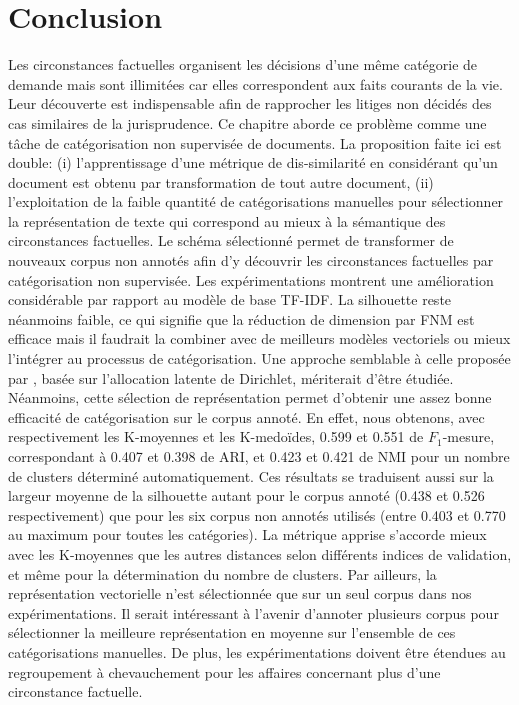 \section{Conclusion}
\label{sec:similarite:conclusion}
Les circonstances factuelles organisent les décisions d'une même catégorie de demande mais sont illimitées car elles correspondent aux faits courants de la vie. Leur découverte est indispensable afin de rapprocher les litiges non décidés des cas similaires de la jurisprudence.  Ce chapitre aborde ce problème comme une tâche de catégorisation non supervisée de documents. La proposition faite ici est double: (i) l'apprentissage d'une métrique de dis-similarité en considérant qu'un document est obtenu par transformation de tout autre document, (ii) l'exploitation de la faible quantité de catégorisations manuelles  pour sélectionner la représentation de texte qui correspond au mieux à la sémantique des circonstances factuelles. Le schéma sélectionné permet de transformer de nouveaux corpus non annotés afin d'y découvrir les circonstances factuelles par catégorisation non supervisée. Les expérimentations montrent une amélioration considérable par rapport au modèle de base TF-IDF. La silhouette reste néanmoins faible, ce qui signifie que la réduction de dimension par FNM est efficace mais il faudrait la combiner avec de meilleurs modèles vectoriels ou mieux l'intégrer au processus de catégorisation. Une approche semblable à celle proposée par \citet{xie2013MGCTM}, basée sur l'allocation latente de Dirichlet, mériterait d'être étudiée. Néanmoins, cette sélection de représentation permet d'obtenir une assez bonne efficacité de catégorisation sur le corpus annoté. En effet, nous obtenons, avec respectivement les K-moyennes et les K-medoïdes, 0.599 et 0.551 de $F_1$-mesure, correspondant à 0.407 et 0.398 de ARI, et 0.423 et 0.421 de NMI pour un nombre de clusters déterminé automatiquement. Ces résultats se traduisent aussi sur la largeur moyenne de la silhouette autant pour le corpus annoté (0.438 et 0.526 respectivement) que pour les six corpus non annotés utilisés (entre 0.403 et 0.770 au maximum pour toutes les catégories). La métrique apprise s'accorde mieux avec les K-moyennes que les autres distances selon différents indices de validation, et même pour la détermination du nombre de clusters. Par ailleurs, la représentation vectorielle n'est sélectionnée que sur un seul corpus dans nos expérimentations. Il serait intéressant à l'avenir d'annoter plusieurs corpus pour sélectionner la meilleure représentation en moyenne sur l'ensemble de ces catégorisations manuelles. De plus, les expérimentations doivent être étendues au regroupement à chevauchement pour les affaires  concernant plus d'une circonstance factuelle.
